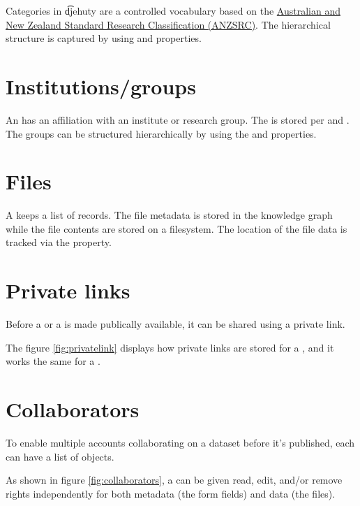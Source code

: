   Categories in \t{djehuty} are a controlled vocabulary based on the
  \href{https://www.abs.gov.au/Ausstats/abs@.nsf/Latestproducts/4AE1B46AE2048A28CA25741800044242}%
  {Australian and New Zealand Standard Research Classification (ANZSRC)}.  The
  hierarchical structure is captured by using  and 
  properties.


\section{Institutions/groups}

  An  has an affiliation with an institute or research group.
  The  is stored per  and
  .  The groups can be structured hierarchically by
  using the  and  properties.


\section{Files}

  A  keeps a list of  records.  The file
  metadata is stored in the knowledge graph while the file contents are
  stored on a filesystem.  The location of the file data is tracked via the
   property.


\section{Private links}

  Before a  or a  is made publically
  available, it can be shared using a private link.


  The figure \ref{fig:privatelink} displays how private links are stored for
  a , and it works the same for a .

\section{Collaborators}

  To enable multiple accounts collaborating on a dataset before it's published,
  each  can have a list of  objects.


  As shown in figure \ref{fig:collaborators}, a  can be
  given read, edit, and/or remove rights independently for both metadata (the
  form fields) and data (the files).
